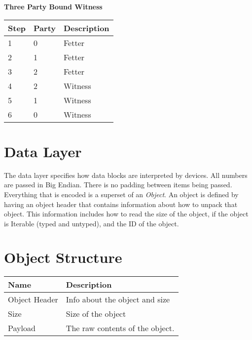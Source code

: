 \documentclass[11pt]{article}
\begin{document}
\noindent
\textbf{Three Party Bound Witness} \\
\begin{center}
	\begin{tabular}{ |l|l|l| }
		\hline
		\textbf{Step} & \textbf{Party} & \textbf{Description} \\
		\hline
						
		1             & 0              & Fetter               \\
		2             & 1              & Fetter               \\
		3             & 2              & Fetter               \\
		4             & 2              & Witness              \\
		5             & 1              & Witness              \\
		6             & 0              & Witness              \\
						
		\hline
	\end{tabular}
\end{center}




\section{Data Layer}
The data layer specifies how data blocks are interpreted by devices. All numbers are passed in Big Endian.  There is no padding between items being passed. Everything that is encoded is a superset of an \textit{Object}. An object is defined by having an object header that contains information about how to unpack that object. This information includes how to read the size of the object, if the object is Iterable (typed and untyped), and the ID of the object.

\section{Object Structure}
\begin{center}
	\begin{tabular}{ |l|l| }
		\hline
		\textbf{Name} & \textbf{Description}            \\
		\hline
		Object Header & Info about the object and size  \\
		Size          & Size of the object              \\
		Payload       & The raw contents of the object. \\
		\hline
	\end{tabular}
\end{center}
\end{document}

